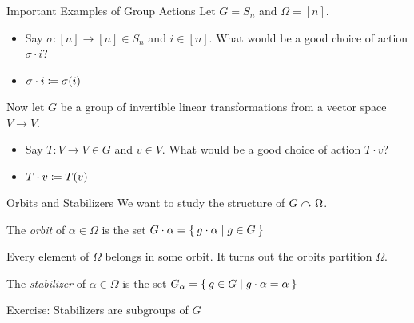 \documentclass[aspectratio=169]{beamer}
\begin{document}
\begin{frame}{Important Examples of Group Actions}
    Let $G = S_n$ and $\Omega = [n]$. \pause
    \begin{itemize}
        \item Say $\sigma\colon [n] \to [n] \in S_n$ and $i \in [n]$. 
            What would be a good choice of action $\sigma \cdot i$? \pause
        \item $\sigma \cdot i \coloneqq \sigma(i)$ \pause
    \end{itemize}

    Now let $G$ be a group of invertible linear transformations from a vector space $V \to V$. \pause
    \begin{itemize}
        \item Say $T\colon V \to V \in G$ and $v \in V$. 
            What would be a good choice of action $T \cdot v$? \pause
        \item $T \cdot v \coloneqq T(v)$
    \end{itemize}
    
\end{frame}

\begin{frame}{Orbits and Stabilizers}
    We want to study the structure of $G \curvearrowright \Omega$.

    \begin{defn}
        The \emph{orbit} of $\alpha \in \Omega$ is the set $G \cdot \alpha = \Set{g \cdot \alpha | g \in G}$
    \end{defn} \pause

    Every element of $\Omega$ belongs in some orbit.
    It turns out the orbits partition $\Omega$. \pause

    \begin{defn}
        The \emph{stabilizer} of $\alpha \in \Omega$ is the set $G_\alpha = \Set{g \in G | g \cdot \alpha = \alpha}$
    \end{defn} \pause

    \textcolor{sigma@alertred}{Exercise:} Stabilizers are subgroups of $G$
\end{frame}
\end{document}

